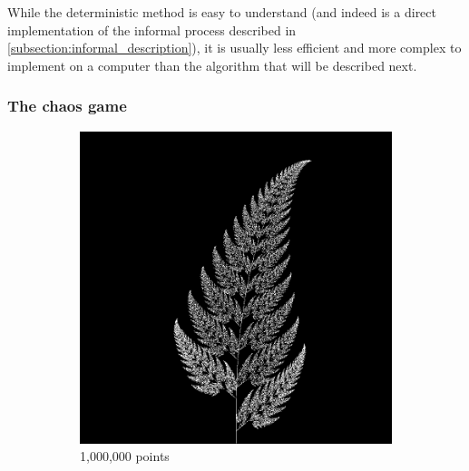 \documentclass[11pt]{article}
\begin{document}
While the deterministic method is easy to understand (and indeed is a direct implementation of the informal process described in \autoref{subsection:informal_description}),
it is usually less efficient and more complex to implement on a computer than the algorithm that will be described next.

\subsubsection{The chaos game}
\label{sec:orgaf5e985}
\label{subsection:chaos_game}

\begin{figure}
     \centering
     \begin{subfigure}[b]{0.4\textwidth}
         \centering
         \includegraphics[width=\textwidth]{figures/barnsley_1000000}
         \caption{1,000,000 points}
         \label{figure:barnsley_mil}
     \end{subfigure}
     \hfill
     \begin{subfigure}[b]{0.4\textwidth}
         \centering

\end{subfigure}
\end{figure}
\end{document}
